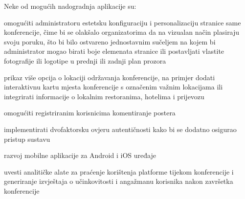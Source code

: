 		
		Neke od mogućih nadogradnja aplikacije su: 
		\begin{packed_item}
			\item omogućiti administratoru estetsku konfiguraciju i personalizaciju stranice same konferencije, čime bi se olakšalo organizatorima da na vizualan način plasiraju svoju poruku, što bi bilo ostvareno jednostavnim sučeljem na kojem bi administrator mogao birati boje elemenata stranice ili postavljati vlastite fotografije ili logotipe u prednji ili zadnji plan prozora
			\item prikaz više opcija o lokaciji održavanja konferencije, na primjer dodati  interaktivnu kartu mjesta konferencije s označenim važnim lokacijama ili integrirati informacije o lokalnim restoranima, hotelima i prijevozu
			\item omogućiti registriranim korisnicima komentiranje postera
			\item implementirati dvofaktorsku ovjeru autentičnosti kako bi se dodatno osigurao pristup sustavu
			\item razvoj mobilne aplikacije za Android i iOS uređaje
			\item uvesti analitičke alate za praćenje korištenja platforme tijekom konferencije i generiranje izvještaja o učinkovitosti i angažmanu korisnika nakon završetka konferencije
		\end{packed_item}

		\eject
		

